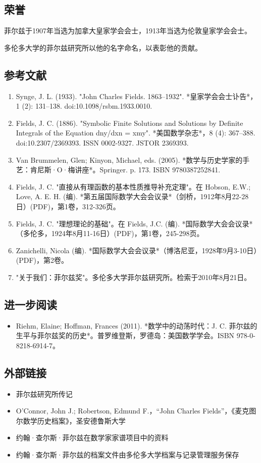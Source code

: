 \subsection{荣誉}  
菲尔兹于1907年当选为加拿大皇家学会会士，1913年当选为伦敦皇家学会会士。

多伦多大学的菲尔兹研究所以他的名字命名，以表彰他的贡献。
\subsection{参考文献}  
\begin{enumerate}
\item Synge, J. L. (1933). "John Charles Fields. 1863–1932". *皇家学会会士讣告*，1 (2): 131–138. doi:10.1098/rsbm.1933.0010.  
\item Fields, J. C. (1886). "Symbolic Finite Solutions and Solutions by Definite Integrals of the Equation dny/dxn = xmy". *美国数学杂志*，8 (4): 367–388. doi:10.2307/2369393. ISSN 0002-9327. JSTOR 2369393.  
\item Van Brummelen, Glen; Kinyon, Michael, eds. (2005). *数学与历史学家的手艺：肯尼斯·O·梅讲座*。Springer. p. 173. ISBN 9780387252841.  
\item Fields, J. C. "直接从有理函数的基本性质推导补充定理"。在 Hobson, E.W.; Love, A. E. H. (编). *第五届国际数学大会会议录*（剑桥，1912年8月22-28日）(PDF)，第1卷，312-326页。  
\item Fields, J. C. "理想理论的基础"。在 Fields, J.C. (编). *国际数学大会会议录*（多伦多，1924年8月11-16日）(PDF)，第1卷，245-298页。  
\item Zanichelli, Nicola (编). *国际数学大会会议录*（博洛尼亚，1928年9月3-10日）(PDF)，第2卷。  
\item "关于我们：菲尔兹奖"。多伦多大学菲尔兹研究所。检索于2010年8月21日。
\end{enumerate}
\subsection{进一步阅读}  
\begin{itemize}
\item Riehm, Elaine; Hoffman, Frances (2011). *数学中的动荡时代：J. C. 菲尔兹的生平与菲尔兹奖的历史*。普罗维登斯，罗德岛：美国数学学会。ISBN 978-0-8218-6914-7。
\end{itemize}
\subsection{外部链接}
\begin{itemize}
\item 菲尔兹研究所传记  
\item O'Connor, John J.; Robertson, Edmund F.，“John Charles Fields”，《麦克图尔数学历史档案》，圣安德鲁斯大学  
\item 约翰·查尔斯·菲尔兹在数学家家谱项目中的资料  
\item 约翰·查尔斯·菲尔兹的档案文件由多伦多大学档案与记录管理服务保存
\end{itemize}